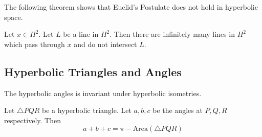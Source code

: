 \documentclass[a4paper]{article}
\begin{document}
The following theorem shows that Euclid's Postulate does not hold in hyperbolic space. 

\begin{thm}{}{} Let $x\in H^2$. Let $L$ be a line in $H^2$. Then there are infinitely many lines in $H^2$ which pass through $x$ and do not intersect $L$. 
\end{thm}

\subsection{Hyperbolic Triangles and Angles}
\begin{prp}{}{} The hyperbolic angles is invariant under hyperbolic isometries. 
\end{prp}

\begin{prp}{}{} Let $\triangle PQR$ be a hyperbolic triangle. Let $a,b,c$ be the angles at $P,Q,R$ respectively. Then $$a+b+c=\pi-\text{Area}(\triangle PQR)$$
\end{prp}
\end{document}
